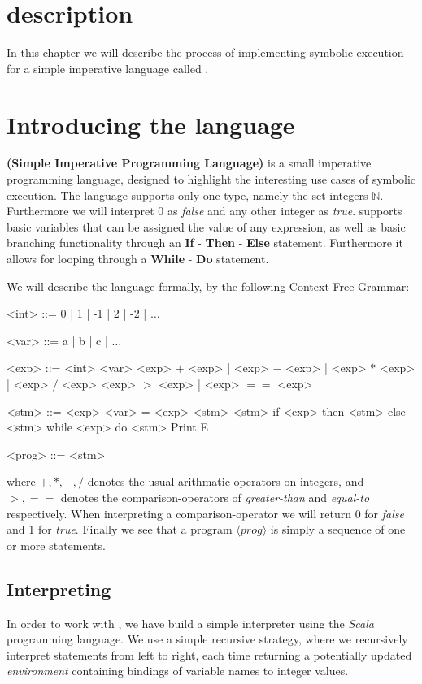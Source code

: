 \section{description}

In this chapter we will describe the process of implementing symbolic execution for a simple imperative language called \simpl.

\section{Introducing the \simpl language}

\simpl\textbf{(Simple Imperative Programming Language)} is a small imperative programming language, designed to highlight the interesting use cases of symbolic execution. The language supports only one type, namely the set integers $\mathbb{N}$.
Furthermore we will interpret 0 as \emph{false} and any other integer as \emph{true}.
 \simpl supports basic
 variables that can be assigned the value of any expression, as well as basic branching functionality through an \textbf{If} - \textbf{Then} - \textbf{Else} statement. Furthermore it allows for looping through a \textbf{While} - \textbf{Do} statement.

We will describe the language formally, by the following Context Free Grammar:

\newpage
\begin{grammar}
	<int> ::= 0 | 1 | -1 | 2 | -2 | $\ldots$
	
	<var> ::= a | b | c | $\ldots$ 
	
	<exp> ::= <int>
	\alt <var>
	\alt <exp> $+$ <exp> | <exp> $-$ <exp> | <exp> $*$ <exp> | <exp> $/$ <exp>
	\alt <exp> $>$ <exp> | <exp> $==$ <exp> 	
	
	<stm> ::= <exp>
	\alt <var> = <exp>
	\alt <stm> <stm>
	\alt if <exp> then <stm> else <stm>
	\alt while <exp> do <stm>
	\alt Print E
	
	<prog> ::= <stm>
	
\end{grammar}

where $+, *, -, /$ denotes the usual arithmatic operators on integers, and $>, ==$ denotes the comparison-operators of \emph{greater-than} and \emph{equal-to} respectively. When interpreting a comparison-operator we will return 0 for \emph{false} and 1 for \emph{true}. Finally we see that a program $\langle prog \rangle$ is simply a sequence of one or more statements.

\subsection{Interpreting \simpl}

In order to work with \simpl, we have build a simple interpreter using the \emph{Scala} programming language. We use a simple recursive strategy, where we recursively interpret statements from left to right, each time returning a potentially updated \emph{environment} containing bindings of variable names to integer values.  
